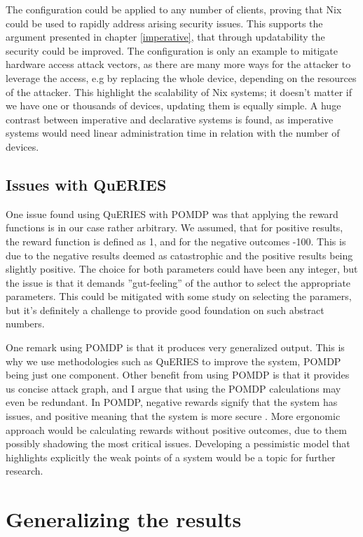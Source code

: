 The configuration could be applied to any number of clients, proving
that Nix could be used to rapidly address arising security
issues. This supports the argument presented in chapter
\ref{imperative}, that through updatability the security could be
improved. The configuration is only an example to mitigate hardware
access attack vectors, as there are many more ways for the attacker to
leverage the access, e.g by replacing the whole device, depending on
the resources of the attacker. This highlight the scalability of Nix
systems; it doesn't matter if we have one or thousands of devices,
updating them is equally simple. A huge contrast between imperative
and declarative systems is found, as imperative systems would need
linear administration time in relation with the number of devices.

\subsection{Issues with QuERIES} \label{issues}

One issue found using QuERIES with POMDP was that applying the reward
functions is in our case rather arbitrary. We assumed, that for
positive results, the reward function is defined as 1, and for the
negative outcomes -100. This is due to the negative results deemed as
catastrophic and the positive results being slightly positive. The
choice for both parameters could have been any integer, but the issue
is that it demands ''gut-feeling'' of the author to select the
appropriate parameters. This could be mitigated with some study on
selecting the paramers, but it's definitely a challenge to provide
good foundation on such abstract numbers.

One remark using POMDP is that it produces very generalized
output. This is why we use methodologies such as QuERIES to improve
the system, POMDP being just one component. Other benefit from using
POMDP is that it provides us concise attack graph, and I argue that
using the POMDP calculations may even be redundant. In POMDP, negative
rewards signify that the system has issues, and positive meaning that
the system is more secure \cite{mcabeeMarkov}. More ergonomic approach
would be calculating rewards without positive outcomes, due to them
possibly shadowing the most critical issues. Developing a pessimistic
model that highlights explicitly the weak points of a system would be
a topic for further research.

\section{Generalizing the results}

